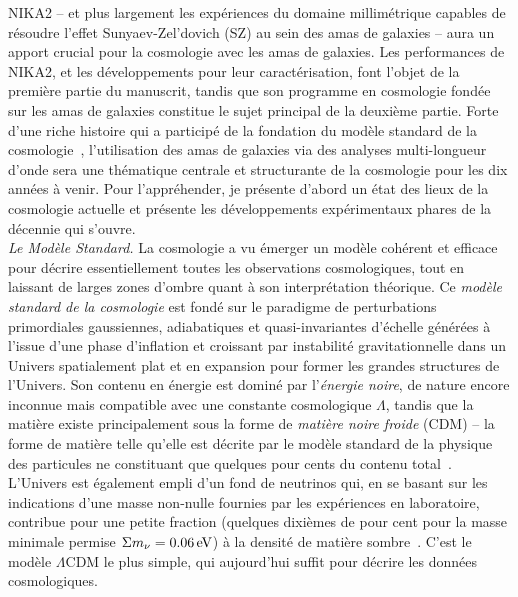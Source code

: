 

NIKA2 -- et plus largement les expériences du domaine
millimétrique capables de résoudre l'effet Sunyaev-Zel'dovich (SZ) au
sein des amas de galaxies -- aura un apport crucial pour la cosmologie
avec les amas de galaxies. Les performances de NIKA2, et les
développements pour leur caractérisation, font l'objet de la première
partie du manuscrit, tandis que son programme en cosmologie fondée sur
les amas de galaxies constitue le sujet principal de la deuxième
partie. Forte d'une riche histoire qui a
participé de la fondation du modèle standard de la
cosmologie~\citep[voir \emph{e.g.}][pour une revue]{Allen2011},
l'utilisation des amas de galaxies via des analyses multi-longueur
d'onde sera une thématique centrale et structurante de la cosmologie pour les dix
années à venir. Pour l'appréhender, je présente d'abord un état des
lieux de la cosmologie actuelle et présente les développements
expérimentaux phares de la décennie qui s'ouvre.\\



\emph{Le Modèle Standard.} La cosmologie a vu émerger un modèle
cohérent et efficace pour décrire essentiellement toutes les
observations cosmologiques, tout en laissant de larges zones d'ombre
quant à son interprétation théorique. Ce \emph{modèle
standard de la cosmologie} est fondé sur le paradigme de perturbations
primordiales gaussiennes, adiabatiques et quasi-invariantes d'échelle
générées à l'issue d'une phase d'inflation et croissant par
instabilité gravitationnelle dans un Univers spatialement plat et en
expansion pour former les grandes structures de l'Univers. Son contenu
en énergie est dominé par l'\emph{énergie noire}, de nature encore
inconnue mais compatible avec une constante cosmologique $\Lambda$, tandis
que la matière existe principalement sous la forme de
\emph{matière noire froide} (CDM) -- la forme de matière telle qu'elle
est décrite par le modèle standard de la physique des particules ne
constituant que quelques pour cents du contenu
total~\citep[pour des mesures récentes,
voir \emph{e.g}][]{Planck_2018_cosmo, BOSS2017, eBOSS2019,
DES2018_cosmo, DES2019_cosmo, SNLS2014, PANSTARR2018}. L'Univers est également empli d'un fond de
neutrinos qui, en se basant sur les indications d'une
masse non-nulle fournies par les expériences en laboratoire,
contribue pour une petite fraction (quelques dixièmes de pour cent pour
la masse minimale permise $\Sigma m_\nu = 0.06\,\rm{eV}$) à
la densité de matière sombre~\citep[voir pour une
revue][]{Lesgourgues2006, Lesgourgues_Book}. C'est le modèle
$\Lambda$CDM le plus simple, qui aujourd'hui suffit pour décrire les
données cosmologiques.\\

